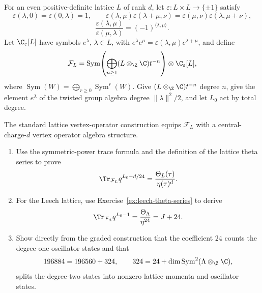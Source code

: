 \begin{exercise}

For an even positive-definite lattice $L$ of rank $d$, let
$\varepsilon:L\times L\to\{\pm1\}$ satisfy
\[
\varepsilon(\lambda,0)=\varepsilon(0,\lambda)=1,
\qquad
\varepsilon(\lambda,\mu)\varepsilon(\lambda+\mu,\nu)
=\varepsilon(\mu,\nu)\varepsilon(\lambda,\mu+\nu),
\]
\[
\frac{\varepsilon(\lambda,\mu)}{\varepsilon(\mu,\lambda)}
=(-1)^{\langle\lambda,\mu\rangle}.
\]
Let $\C_\varepsilon[L]$ have symbols $e^\lambda$, $\lambda\in L$, with
$e^\lambda e^\mu=\varepsilon(\lambda,\mu)e^{\lambda+\mu}$, and define
\[
\mathcal F_L
=\operatorname{Sym}\!\left(
\bigoplus_{n\geq1}(L\otimes_\Z\C)t^{-n}\right)
\otimes\C_\varepsilon[L],
\]
where $\operatorname{Sym}(W)=\bigoplus_{r\geq0}\operatorname{Sym}^r(W)$.
Give $(L\otimes_\Z\C)t^{-n}$ degree $n$, give the element $e^\lambda$ of
the twisted group algebra degree $\|\lambda\|^2/2$, and let $L_0$ act by
total degree.

The standard lattice vertex-operator construction equips $\mathcal F_L$ with
a central-charge-$d$ vertex operator algebra structure.
\begin{enumerate}[label=(\alph*)]
\item Use the
symmetric-power trace formula and the definition of the lattice theta series
to prove
\[
\Tr_{\mathcal F_L}q^{L_0-d/24}
=\frac{\Theta_L(\tau)}{\eta(\tau)^d}.
\]
\item For the Leech lattice, use Exercise~\ref{ex:leech-theta-series} to derive
\[
\Tr_{\mathcal F_\Lambda}q^{L_0-1}
=\frac{\Theta_\Lambda}{\eta^{24}}=J+24.
\]
\item Show directly from the graded construction that the coefficient $24$ counts
the degree-one oscillator states and that
\[
196884=196560+324,
\qquad
324=24+\dim\operatorname{Sym}^2(\Lambda\otimes_\Z\C),
\]
splits the degree-two states into nonzero lattice momenta and oscillator
states.
\end{enumerate}
\end{exercise}

